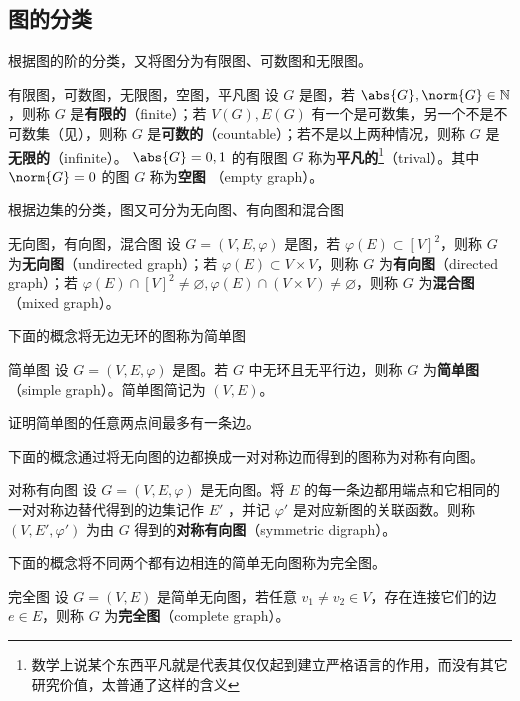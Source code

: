 \subsection{图的分类}
根据图的阶的分类，又将图分为有限图、可数图和无限图。
\begin{definition}{有限图，可数图，无限图，空图，平凡图}
设 $G$ 是图，若 $\abs{G},\norm{G}\in\mathbb N$，则称 $G$ 是\textbf{有限的}（finite）；若 $V(G),E(G)$ 有一个是可数集，另一个不是不可数集（见），则称 $G$ 是\textbf{可数的}（countable）；若不是以上两种情况，则称 $G$ 是\textbf{无限的}（infinite）。 $\abs{G}=0,1$ 的有限图 $G$ 称为\textbf{平凡的}\footnote{数学上说某个东西平凡就是代表其仅仅起到建立严格语言的作用，而没有其它研究价值，太普通了这样的含义}（trival）。其中 $\norm{G}=0$ 的图 $G$ 称为\textbf{空图} （empty graph）。 
\end{definition}

根据边集的分类，图又可分为无向图、有向图和混合图
\begin{definition}{无向图，有向图，混合图}
设 $G=(V,E,\varphi)$ 是图，若 $\varphi(E)\subset[V]^2$，则称 $G$ 为\textbf{无向图}（undirected graph）；若 $\varphi(E)\subset V\times V$，则称 $G$ 为\textbf{有向图}（directed graph）；若 $\varphi(E)\cap[V]^2\neq\varnothing,\varphi(E)\cap (V\times V)\neq\varnothing$，则称 $G$ 为\textbf{混合图}（mixed graph）。
\end{definition}

下面的概念将无边无环的图称为简单图
\begin{definition}{简单图}
设 $G=(V,E,\varphi)$ 是图。若 $G$ 中无环且无平行边，则称 $G$ 为\textbf{简单图}（simple graph）。简单图简记为 $(V,E)$。
\end{definition}
\begin{exercise}{}
证明简单图的任意两点间最多有一条边。
\end{exercise}

下面的概念通过将无向图的边都换成一对对称边而得到的图称为对称有向图。

\begin{definition}{对称有向图}
设 $G=(V,E,\varphi)$ 是无向图。将 $E$ 的每一条边都用端点和它相同的一对对称边替代得到的边集记作 $E'$ ，并记 $\varphi'$ 是对应新图的关联函数。则称 $(V,E',\varphi')$ 为由 $G$ 得到的\textbf{对称有向图}（symmetric digraph）。 
\end{definition}

下面的概念将不同两个都有边相连的简单无向图称为完全图。
\begin{definition}{完全图}
设 $G=(V,E)$ 是简单无向图，若任意 $v_1\neq v_2\in V$，存在连接它们的边 $e\in E$，则称 $G$ 为\textbf{完全图}（complete graph）。
\end{definition}

